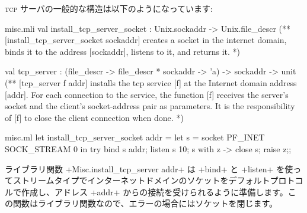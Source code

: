 \textsc{tcp} サーバの一般的な構造は以下のようになっています:
%
\begin{codefile}{misc.mli}
val install_tcp_server_socket : Unix.sockaddr -> Unix.file_descr
(** [install_tcp_server_socket sockaddr] creates a socket in the internet
 domain,  binds it to the address [sockaddr], listens to it, and returns
it. *)

val tcp_server :
 (file_descr -> file_descr * sockaddr -> 'a) -> sockaddr -> unit
(** [tcp_server f addr] installs the tcp service [f] at the Internet domain
   address  [addr]. For each connection to the service, the
   function [f] receives the server's socket and the client's
   socket-address pair as parameters. It is the responsibility of  [f] to
   close the client connection when done. *)
\end{codefile}
%
\begin{listingcodefile}{misc.ml}
let install_tcp_server_socket addr =
  let s = socket PF_INET SOCK_STREAM 0 in
  try
    bind s addr;
    listen s 10;
    s
  with z -> close s; raise z;;
\end{listingcodefile}
ライブラリ関数 \ml+Misc.install_tcp_server addr+ は \ml+bind+ と \ml+listen+ を使ってストリームタイプでインターネットドメインのソケットをデフォルトプロトコルで作成し、アドレス \ml+addr+ からの接続を受けられるように準備します。この関数はライブラリ関数なので、エラーの場合にはソケットを閉じます。

